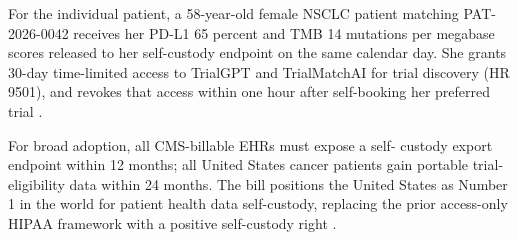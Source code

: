 \hspace{0.5cm} For the individual patient, a 58-year-old female NSCLC patient
matching PAT-2026-0042 receives her PD-L1 65 percent and TMB 14
mutations per megabase scores released to her self-custody endpoint
on the same calendar day. She grants 30-day time-limited access to
TrialGPT and TrialMatchAI for trial discovery (HR 9501), and
revokes that access within one hour after self-booking her
preferred trial \cite{jin2024trialgpt, abdallah2026trialmatchai,
kawchak_2026_19119939}.

For broad adoption, all CMS-billable EHRs must expose a self-
custody export endpoint within 12 months; all United States cancer
patients gain portable trial-eligibility data within 24 months.
The bill positions the United States as Number 1 in the world for
patient health data self-custody, replacing the prior access-only
HIPAA framework with a positive self-custody right
\cite{kawchak_2026_19119939, kawchak_2026_19994945}.
